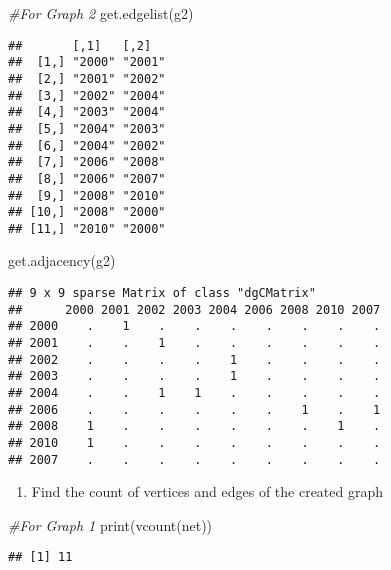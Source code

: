 \documentclass[
]{article}
\newenvironment{Shaded}{\begin{snugshade}}{\end{snugshade}}
\newcommand{\CommentTok}[1]{\textcolor[rgb]{0.56,0.35,0.01}{\textit{#1}}}
\newcommand{\FunctionTok}[1]{\textcolor[rgb]{0.00,0.00,0.00}{#1}}
\newcommand{\NormalTok}[1]{#1}
\providecommand{\tightlist}{%
  \setlength{\itemsep}{0pt}\setlength{\parskip}{0pt}}
\begin{document}
\begin{Shaded}
\begin{Highlighting}[]
\CommentTok{\#For Graph 2}
\FunctionTok{get.edgelist}\NormalTok{(g2)}
\end{Highlighting}
\end{Shaded}

\begin{verbatim}
##       [,1]   [,2]  
##  [1,] "2000" "2001"
##  [2,] "2001" "2002"
##  [3,] "2002" "2004"
##  [4,] "2003" "2004"
##  [5,] "2004" "2003"
##  [6,] "2004" "2002"
##  [7,] "2006" "2008"
##  [8,] "2006" "2007"
##  [9,] "2008" "2010"
## [10,] "2008" "2000"
## [11,] "2010" "2000"
\end{verbatim}

\begin{Shaded}
\begin{Highlighting}[]
\FunctionTok{get.adjacency}\NormalTok{(g2)}
\end{Highlighting}
\end{Shaded}

\begin{verbatim}
## 9 x 9 sparse Matrix of class "dgCMatrix"
##      2000 2001 2002 2003 2004 2006 2008 2010 2007
## 2000    .    1    .    .    .    .    .    .    .
## 2001    .    .    1    .    .    .    .    .    .
## 2002    .    .    .    .    1    .    .    .    .
## 2003    .    .    .    .    1    .    .    .    .
## 2004    .    .    1    1    .    .    .    .    .
## 2006    .    .    .    .    .    .    1    .    1
## 2008    1    .    .    .    .    .    .    1    .
## 2010    1    .    .    .    .    .    .    .    .
## 2007    .    .    .    .    .    .    .    .    .
\end{verbatim}

\begin{enumerate}
\def\labelenumi{\arabic{enumi}.}
\setcounter{enumi}{3}
\tightlist
\item
  Find the count of vertices and edges of the created graph
\end{enumerate}

\begin{Shaded}
\begin{Highlighting}[]
\CommentTok{\#For Graph 1}
\FunctionTok{print}\NormalTok{(}\FunctionTok{vcount}\NormalTok{(net))}
\end{Highlighting}
\end{Shaded}

\begin{verbatim}
## [1] 11
\end{verbatim}
\end{document}
